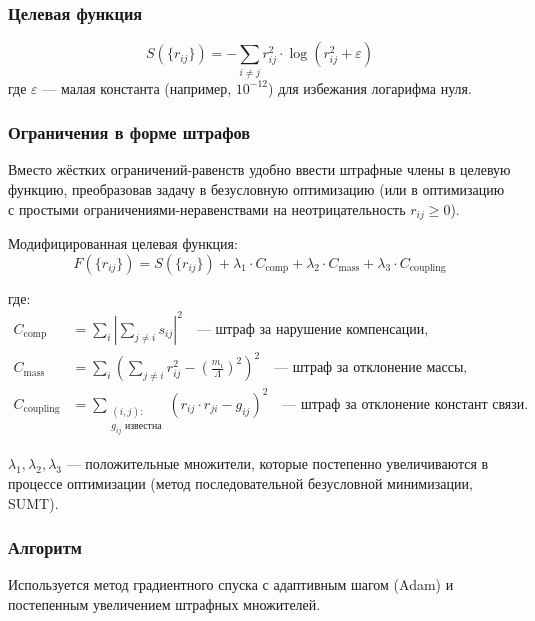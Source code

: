 \documentclass[12pt,a4paper]{article}
\begin{document}
\subsubsection{Целевая функция}
\begin{equation}
    S(\{r_{ij}\}) = -\sum_{i \neq j} r_{ij}^2 \cdot \log(r_{ij}^2 + \varepsilon)
\end{equation}
где $\varepsilon$ --- малая константа (например, $10^{-12}$) для избежания логарифма нуля.

\subsubsection{Ограничения в форме штрафов}
Вместо жёстких ограничений-равенств удобно ввести штрафные члены в целевую функцию, преобразовав задачу в безусловную оптимизацию (или в оптимизацию с простыми ограничениями-неравенствами на неотрицательность $r_{ij} \geq 0$).

Модифицированная целевая функция:
\begin{equation}
    F(\{r_{ij}\}) = S(\{r_{ij}\}) + \lambda_1 \cdot C_{\text{comp}} + \lambda_2 \cdot C_{\text{mass}} + \lambda_3 \cdot C_{\text{coupling}}
\end{equation}

где:
\begin{align}
    C_{\text{comp}} &= \sum_i \left| \sum_{j \neq i} s_{ij} \right|^2 \quad \text{--- штраф за нарушение компенсации,} \\
    C_{\text{mass}} &= \sum_i \left( \sum_{j \neq i} r_{ij}^2 - \left( \frac{m_i}{\Lambda} \right)^2 \right)^2 \quad \text{--- штраф за отклонение массы,} \\
    C_{\text{coupling}} &= \sum_{\substack{(i,j): \\ g_{ij} \text{ известна}}} \left( r_{ij} \cdot r_{ji} - g_{ij} \right)^2 \quad \text{--- штраф за отклонение констант связи.}
\end{align}

$\lambda_1, \lambda_2, \lambda_3$ --- положительные множители, которые постепенно увеличиваются в процессе оптимизации (метод последовательной безусловной минимизации, SUMT).

\subsubsection{Алгоритм}
Используется метод градиентного спуска с адаптивным шагом (Adam) и постепенным увеличением штрафных множителей.
\end{document}
